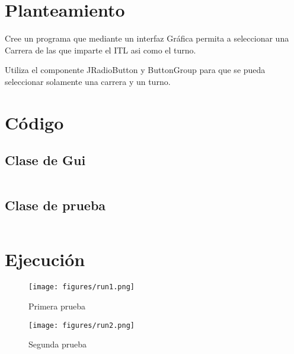 \documentclass[12pt]{article}
\author{Pablo Vargas Bermúdez}
\begin{document}
\pagestyle{empty}


\section*{Planteamiento}

Cree un programa que mediante un interfaz Gráfica permita a
seleccionar una Carrera de las que imparte el ITL asi como el turno.

Utiliza el componente JRadioButton y ButtonGroup para que se pueda
seleccionar solamente una carrera y un turno.

\section*{Código}

\subsection*{Clase de Gui}
\inputminted{Java}{Carreras.java}
\subsection*{Clase de prueba}
\inputminted{Java}{Prueba.java}

\section*{Ejecución}

\begin{figure}[ht]
  \centering
  \texttt{[image: figures/run1.png]}
  \caption{Primera prueba}
\end{figure}

\begin{figure}[ht]
  \centering
  \texttt{[image: figures/run2.png]}
  \caption{Segunda prueba}
\end{figure}
\end{document}
